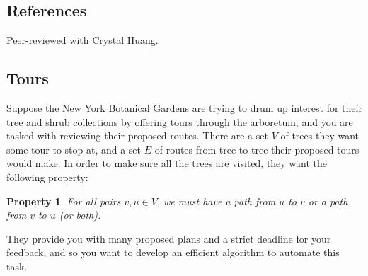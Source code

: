 \def\lc{\left\lceil}   
\def\rc{\right\rceil}
\newtheorem{claim}{Claim}
\newtheorem{property}{Property}
\runningheadrule
\firstpageheadrule
\cfoot{}
\subsection*{References}
Peer-reviewed with Crystal Huang.
\subsection{Tours}
Suppose the New York Botanical Gardens are trying to drum up interest for their tree and shrub collections by offering tours through the arboretum, and you are tasked with reviewing their proposed routes. There are a set $V$ of trees they want some tour to stop at, and a set $E$ of routes from tree to tree their proposed tours would make. In order to make sure all the trees are visited, they want the following property:
\begin{property} 
For all pairs $v, u\in V$, we must have a path from $u$ to $v$ or a path from $v$ to $u$ (or both). 
\end{property}
\noindent They provide you with many proposed plans and a strict deadline for your feedback, and so you want to develop an efficient algorithm to automate this task. 

